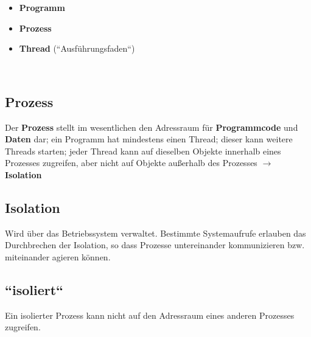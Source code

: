 \begin{itemize}
    \item \textbf{Programm}
    \item  \textbf{Prozess}
    \item \textbf{Thread} (``Ausführungsfaden``)
\end{itemize}\\

\subsection*{Prozess}
Der \textbf{Prozess} stellt im wesentlichen den Adressraum für \textbf{Programmcode} und \textbf{Daten} dar; ein Programm hat mindestens einen Thread; dieser kann weitere Threads starten; jeder Thread kann auf dieselben Objekte innerhalb eines Prozesses zugreifen, aber nicht auf Objekte außerhalb des Prozesses $\rightarrow$ \textbf{Isolation}

\subsection*{Isolation}
Wird über das Betriebssystem verwaltet. Bestimmte Systemaufrufe erlauben das Durchbrechen der Isolation, so dass Prozesse untereinander kommunizieren bzw. miteinander agieren können.

\subsection*{``isoliert``}
Ein isolierter Prozess kann nicht auf den Adressraum eines anderen Prozesses zugreifen.
